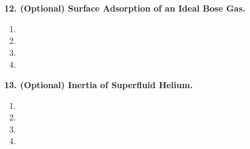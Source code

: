 \documentclass{article}
\theoremstyle{definition}
\begin{document}
\noindent \textbf{12. (Optional) Surface Adsorption of an Ideal Bose Gas.}

\begin{enumerate}[label=(\alph*)]
	\item 
	
	\item 
	
	\item 
	
	\item 
	
\end{enumerate}



\noindent \textbf{13. (Optional) Inertia of Superfluid Helium.}

\begin{enumerate}[label=(\alph*)]
	\item 
	
	\item 
	
	\item 
	
	\item 
	
\end{enumerate}

	
\end{document}

